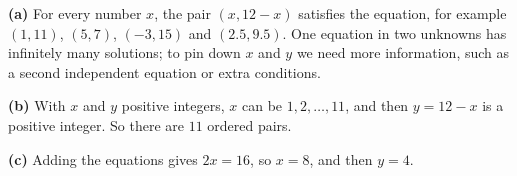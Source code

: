 \textbf{(a)} For every number $x$, the pair $(x,12-x)$ satisfies the equation, for example $(1,11)$, $(5,7)$, $(-3,15)$ and $(2.5,9.5)$. One equation in two unknowns has infinitely many solutions; to pin down $x$ and $y$ we need more information, such as a second independent equation or extra conditions.

\textbf{(b)} With $x$ and $y$ positive integers, $x$ can be $1,2,\dots,11$, and then $y=12-x$ is a positive integer. So there are $\boxed{11}$ ordered pairs.

\textbf{(c)} Adding the equations gives $2x=16$, so $x=\boxed{8}$, and then $y=\boxed{4}$.
